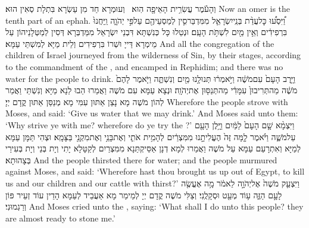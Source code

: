{וְהָעֹ֕מֶר עֲשִׂרִ֥ית הָאֵיפָ֖ה הֽוּא׃ \petucha }
{וְעוּמְרָא חַד מִן עַשְׂרָא בִּתְלָת סְאִין הוּא׃}
{Now an omer is the tenth part of an ephah.}{}
\newperek
{}
{וַ֠יִּסְע֠וּ כׇּל\maqqaf עֲדַ֨ת בְּנֵֽי\maqqaf יִשְׂרָאֵ֧ל מִמִּדְבַּר\maqqaf סִ֛ין לְמַסְעֵיהֶ֖ם עַל\maqqaf פִּ֣י יְהֹוָ֑ה וַֽיַּחֲנוּ֙ בִּרְפִידִ֔ים וְאֵ֥ין מַ֖יִם לִשְׁתֹּ֥ת הָעָֽם׃}
{וּנְטַלוּ כָּל כְּנִשְׁתָּא דִּבְנֵי יִשְׂרָאֵל מִמַּדְבְּרָא דְּסִין לְמַטְּלָנֵיהוֹן עַל מֵימְרָא דַּייָ וּשְׁרוֹ בִּרְפִידִים וְלֵית מַיָּא לְמִשְׁתֵּי עַמָּא׃}
{And all the congregation of the children of Israel journeyed from the wilderness of Sin, by their stages, according to the commandment of the \lord, and encamped in Rephidim; and there was no water for the people to drink.}{}
{וַיָּ֤רֶב הָעָם֙ עִם\maqqaf מֹשֶׁ֔ה וַיֹּ֣אמְר֔וּ תְּנוּ\maqqaf לָ֥נוּ מַ֖יִם וְנִשְׁתֶּ֑ה וַיֹּ֤אמֶר לָהֶם֙ מֹשֶׁ֔ה מַה\maqqaf תְּרִיבוּן֙ עִמָּדִ֔י מַה\maqqaf תְּנַסּ֖וּן אֶת\maqqaf יְהֹוָֽה׃}
{וּנְצָא עַמָּא עִם מֹשֶׁה וַאֲמַרוּ הַבוּ לַנָא מַיָּא וְנִשְׁתֵּי וַאֲמַר לְהוֹן מֹשֶׁה מָא נָצַן אַתּוּן עִמִּי מָא מְנַסַּן אַתּוּן קֳדָם יְיָ׃}
{Wherefore the people strove with Moses, and said: ‘Give us water that we may drink.’ And Moses said unto them: ‘Why strive ye with me? wherefore do ye try the \lord?’}{}
{וַיִּצְמָ֨א שָׁ֤ם הָעָם֙ לַמַּ֔יִם וַיָּ֥לֶן הָעָ֖ם עַל\maqqaf מֹשֶׁ֑ה וַיֹּ֗אמֶר לָ֤מָּה זֶּה֙ הֶעֱלִיתָ֣נוּ מִמִּצְרַ֔יִם לְהָמִ֥ית אֹתִ֛י וְאֶת\maqqaf בָּנַ֥י וְאֶת\maqqaf מִקְנַ֖י בַּצָּמָֽא׃}
{וּצְהִי תַּמָּן עַמָּא לְמַיָּא וְאִתְרָעַם עַמָּא עַל מֹשֶׁה וַאֲמַרוּ לְמָא דְנָן אַסֵּיקְתַּנָא מִמִּצְרַיִם לְקַטָּלָא יָתִי וְיָת בְּנַי וְיָת בְּעִירַי בְּצָהוּתָא׃}
{And the people thirsted there for water; and the people murmured against Moses, and said: ‘Wherefore hast thou brought us up out of Egypt, to kill us and our children and our cattle with thirst?’}{}
{וַיִּצְעַ֤ק מֹשֶׁה֙ אֶל\maqqaf יְהֹוָ֣ה לֵאמֹ֔ר מָ֥ה אֶעֱשֶׂ֖ה לָעָ֣ם הַזֶּ֑ה ע֥וֹד מְעַ֖ט וּסְקָלֻֽנִי׃}
{וְצַלִּי מֹשֶׁה קֳדָם יְיָ לְמֵימַר מָא אַעֲבֵיד לְעַמָּא הָדֵין עוֹד זְעֵיר פּוֹן וְרַגְמוּנִי׃}
{And Moses cried unto the \lord, saying: ‘What shall I do unto this people? they are almost ready to stone me.’}{}
